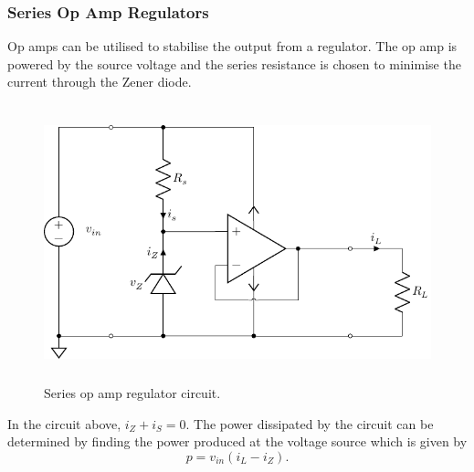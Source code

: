 \documentclass{article}
\begin{document}
\subsubsection{Series Op Amp Regulators}
Op amps can be utilised to stabilise the output from a regulator. The
op amp is powered by the source voltage and the series resistance is
chosen to minimise the current through the Zener diode.
\begin{figure}[H]
    \centering
    \includegraphics[height = 8cm, keepaspectratio = true]{figures/series_op_amp_regulator.pdf}
    \caption{Series op amp regulator circuit.}
\end{figure}
In the circuit above, \(i_Z + i_S = 0\). The power dissipated by the
circuit can be determined by finding the power produced at the voltage
source which is given by
\begin{equation*}
    p = v_{in} \left( i_L - i_Z \right).
\end{equation*}
\newpage
\listoffigures
\end{document}
